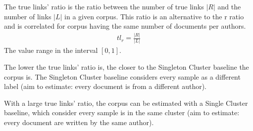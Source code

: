 \begin{definition}
  The true links' ratio is the ratio between the number of true links $|R|$ and the number of links $|L|$ in a given corpus.
  This ratio is an alternative to the r ratio and is correlated for corpus having the same number of documents per authors.
  \begin{gather*}
    tl_r = \frac{|R|}{|L|}
  \end{gather*}
  The value range in the interval $\left[0, 1\right]$.

  The lower the true links' ratio is, the closer to the Singleton Cluster baseline the corpus is.
  The Singleton Cluster baseline considers every sample as a different label (aim to estimate: every document is from a different author).

  With a large true links' ratio, the corpus can be estimated with a Single Cluster baseline, which consider every sample is in the same cluster (aim to estimate: every document are written by the same author).
\end{definition}
